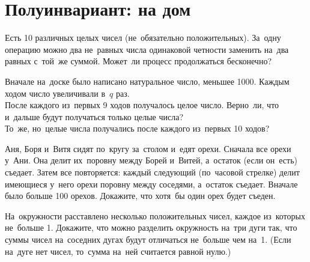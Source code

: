 
\section*{Полуинвариант: на дом}




\begin{problems}

Есть 10 различных целых чисел (не~обязательно положительных).
За~одну операцию можно два не~равных числа одинаковой четности заменить
на~два равных с~той~же суммой.
Может~ли процесс продолжаться бесконечно?

Вначале на~доске было написано натуральное число, меньшее 1000.
Каждым ходом число увеличивали в~$q$ раз.
\\
\sp
После каждого из~первых 9 ходов получалось целое число.
Верно~ли, что и~дальше будут получаться только целые числа?
\\
\sp
То~же, но~целые числа получались после каждого из~первых 10 ходов?

Аня, Боря и~Витя сидят по~кругу за~столом и~едят орехи.
Сначала все орехи у~Ани.
Она делит их~поровну между Борей и~Витей, а~остаток (если он~есть) съедает.
Затем все повторяется: каждый следующий (по~часовой стрелке) делит имеющиеся
у~него орехи поровну между соседями, а~остаток съедает.
Вначале было больше 100 орехов.
Докажите, что хотя~бы один орех будет съеден.

На~окружности расставлено несколько положительных чисел, каждое из~которых
не~больше 1.
Докажите, что можно разделить окружность на~три дуги так, что суммы чисел
на~соседних дугах будут отличаться не~больше чем на~1.
(Если на~дуге нет чисел, то~сумма на~ней считается равной нулю.)

\end{problems}


